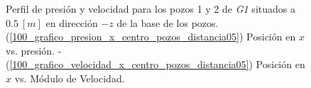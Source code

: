 \documentclass[10pt,a4paper,final]{article}
\begin{document}
\begin{figure}[tbhp]
   \centering
   \hspace{0.1\linewidth}
    \caption{Perfil de presión y velocidad para los pozos 1 y 2 de \emph{G1} situados a $0.5~[m]$ en dirección $-z$ de la base de los pozos. (\ref{100_grafico_presion_x_centro_pozos_distancia05}) Posición en $x$ vs. presión. - (\ref{100_grafico_velocidad_x_centro_pozos_distancia05}) Posición en $x$ vs. Módulo de Velocidad.}
   \label{100_grafico_velocidad_presion_centro_pozos_distancia05}                %
\end{figure}
\end{document}
